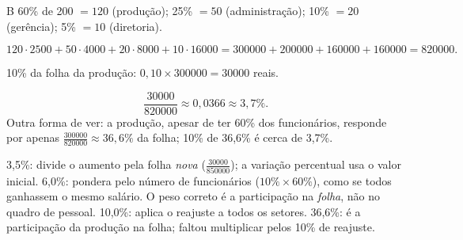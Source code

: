 \begin{resolucao}{B}
 60\% de 200 $=120$ (produção); 25\% $=50$ (administração); 10\% $=20$ (gerência); 5\% $=10$ (diretoria).

\[
120\cdot\num{2500}+50\cdot\num{4000}+20\cdot\num{8000}+10\cdot\num{16000}
=\num{300000}+\num{200000}+\num{160000}+\num{160000}=\num{820000}.
\]

 10\% da folha da produção: $0{,}10\times\num{300000}=\num{30000}$ reais.

\[
\frac{\num{30000}}{\num{820000}}\approx0{,}0366\approx3{,}7\%.
\]
Outra forma de ver: a produção, apesar de ter 60\% dos funcionários, responde por apenas $\frac{\num{300000}}{\num{820000}}\approx36{,}6\%$ da folha; 10\% de 36,6\% é cerca de 3,7\%.

\begin{distratores}
 3,5\%: divide o aumento pela folha \emph{nova} ($\frac{\num{30000}}{\num{850000}}$); a variação percentual usa o valor inicial.
 6,0\%: pondera pelo número de funcionários ($10\%\times60\%$), como se todos ganhassem o mesmo salário. O peso correto é a participação na \emph{folha}, não no quadro de pessoal.
 10,0\%: aplica o reajuste a todos os setores.
 36,6\%: é a participação da produção na folha; faltou multiplicar pelos 10\% de reajuste.
\end{distratores}
\end{resolucao}
